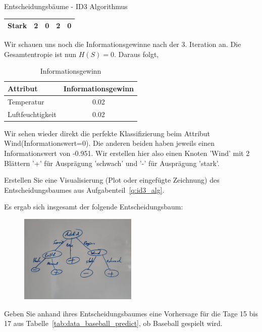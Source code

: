 \begin{task}[credit=16]{Entscheidungsbäume - ID3 Algorithmus}
\begin{subtask}[points=10,title=ID3 Algorithmus]
\begin{solution}
\begin{table}[H]
\begin{tabular}{l|c|c|c|c}
		Stark&2&0&2&0\\
		\bottomrule
	\end{tabular}
\end{table}
Wir schauen uns noch die Informationsgewinne nach der 3. Iteration an. Die Gesamtentropie ist nun $H(S) = 0$. Daraus folgt, 
\begin{table}[H]
	\centering
	\caption{Informationsgewinn}
	\begin{tabular}{l|c}
		\toprule
		\textbf{Attribut} & \textbf{Informationsgewinn}  \\
		\midrule
		Temperatur & 0.02\\
		Luftfeuchtigkeit & 0.02\\
		\bottomrule
	\end{tabular}
\end{table}
Wir sehen wieder direkt die perfekte Klassifizierung beim Attribut Wind(Informationswert=0). Die anderen beiden haben jeweils einen Informationswert von -0.951. Wir erstellen hier also einen Knoten 'Wind' mit 2 Blättern '+' für Ausprägung 'schwach' und '-' für Ausprägung 'stark'.
\end{solution}

\end{subtask}

\begin{subtask}[points=3,title=Visualisierung]
Erstellen Sie eine Visualisierung (Plot oder eingefügte Zeichnung) des Entscheidungsbaumes aus Aufgabenteil~\ref{q:id3_alg}.

\begin{solution}
Es ergab sich insgesamt der folgende Entscheidungsbaum:
\begin{figure}[H]
	\includegraphics[width=0.5\textwidth]{1a.jpg}
\end{figure}
\end{solution}

\end{subtask}

\begin{subtask}[points=3,title=Vorhersage]
Geben Sie anhand ihres Entscheidungsbaumes eine Vorhersage für die Tage 15 bis 17 aus Tabelle~\ref{tab:data_baseball_predict}, ob Baseball gespielt wird.


\end{subtask}
\end{task}
